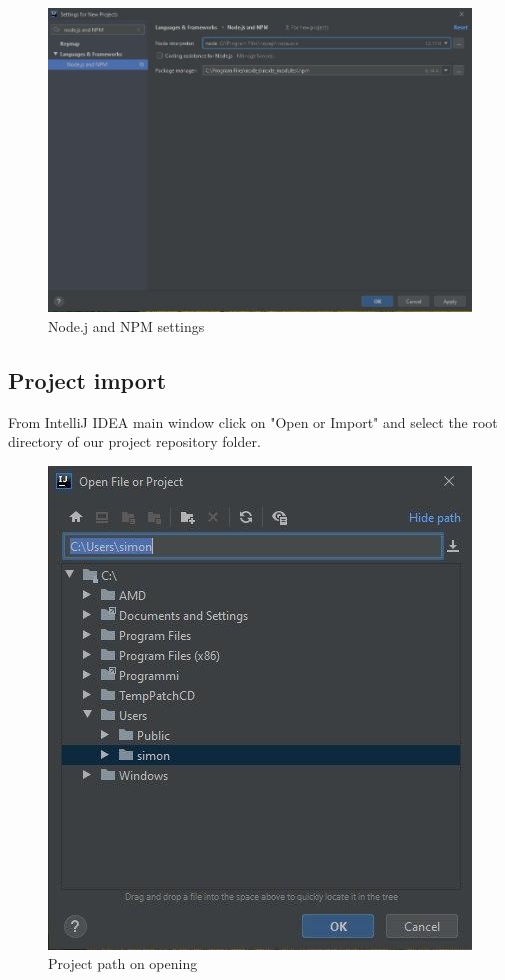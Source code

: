 \begin{figure}[H]
		\centering
		\includegraphics[scale=0.60]{../Developer_manual/img/nodejs_and_npm.jpg}
		\caption{Node.j and NPM settings}
	\end{figure}	

	\subsection{Project import}
From IntelliJ IDEA main window click on "Open or Import" and select the root directory of our project repository folder.

\begin{figure}[H]
		\centering
		\includegraphics[scale=0.80]{../Developer_manual/img/open_project.jpg}
		\caption{Project path on opening}
	\end{figure}	


